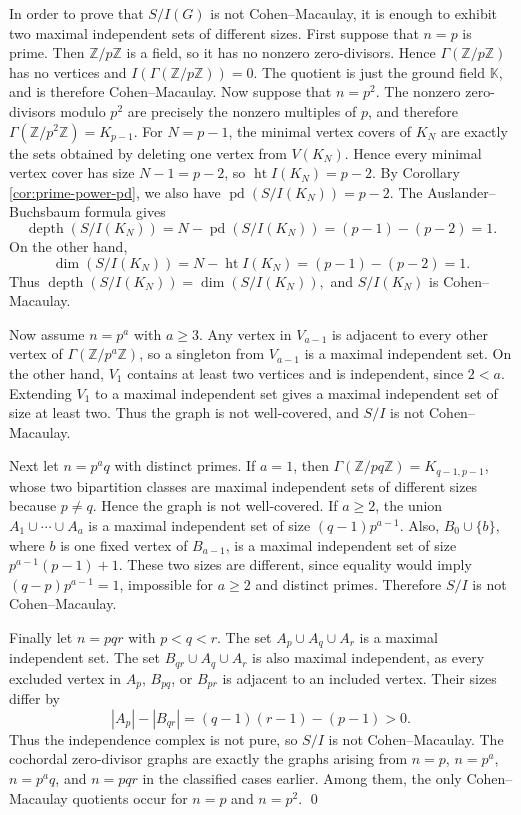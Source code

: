 \documentclass[12pt]{article}
\theoremstyle{definition}
\renewenvironment{proof}{{\bf \noindent Proof.}}{\qed}
\begin{document}
\begin{proof}
	In order to prove that $S/I(G)$ is not Cohen--Macaulay, it
	is enough to exhibit two maximal independent sets of different sizes.
	 First suppose that $n=p$ is prime.  Then $\mathbb{Z}/p\mathbb{Z}$ is a field, so it has no
	nonzero zero-divisors.  Hence $\Gamma(\mathbb{Z}/p\mathbb{Z})$ has no vertices and
	$I(\Gamma(\mathbb{Z}/p\mathbb{Z}))=0$.  The quotient is just the ground field $\mathbb{K}$, and is
	therefore Cohen--Macaulay. Now suppose that $n=p^2$.  The nonzero zero-divisors modulo $p^2$ are precisely
	the nonzero multiples of $p$,   and therefore
	$ \Gamma(\mathbb{Z}/p^2\mathbb{Z})=K_{p-1}. $ For $N=p-1$, the minimal vertex covers of $K_N$ are exactly the sets obtained by deleting
	one vertex from $V(K_N)$.  Hence every minimal vertex cover has size $N-1=p-2$,
	so $
	\operatorname{ht} I(K_N)=p-2. $
	By Corollary \ref{cor:prime-power-pd},   we also have
	$
	\operatorname{pd}(S/I(K_N))=p-2.
	$
	The Auslander--Buchsbaum formula gives
	$$
	\operatorname{depth}(S/I(K_N))
	=
	N-\operatorname{pd}(S/I(K_N))
	=
	(p-1)-(p-2)
	=
	1.
	$$
	On the other hand,
	$$
	\dim(S/I(K_N))
	=
	N-\operatorname{ht} I(K_N)
	=
	(p-1)-(p-2)
	=
	1.
	$$
	Thus $
	\operatorname{depth}(S/I(K_N))=\dim(S/I(K_N)), $
	and $S/I(K_N)$ is Cohen--Macaulay.

\medskip

Now assume $n=p^a$ with $a\geq 3$.  Any vertex in $V_{a-1}$ is adjacent to every other vertex of $\Gamma(\mathbb{Z}/p^a\mathbb{Z})$, so a singleton from $V_{a-1}$ is a maximal independent set.  On the other hand, $V_1$ contains at least two vertices and is independent, since $2<a$.  Extending $V_1$ to a maximal independent set gives a maximal independent set of size at least two.  Thus the graph is not well-covered, and $S/I$ is not Cohen--Macaulay.

\medskip

Next let $n=p^a q$ with distinct primes.  If $a=1$, then $\Gamma(\mathbb{Z}/pq\mathbb{Z})=K_{q-1,p-1}$, whose two bipartition classes are maximal independent sets of different sizes because $p\neq q$.  Hence the graph is not well-covered.  If $a\geq 2$, the union $A_1\cup\cdots\cup A_a$ is a maximal independent set of size $(q-1)p^{a-1}$.  Also, $B_0\cup\{b\}$, where $b$ is one fixed vertex of $B_{a-1}$, is a maximal independent set of size $p^{a-1}(p-1)+1$.  These two sizes are different, since equality would imply $(q-p)p^{a-1}=1$, impossible for $a\geq 2$ and distinct primes.  Therefore $S/I$ is not Cohen--Macaulay.

\medskip

Finally let $n=pqr$ with $p<q<r$.  The set $A_p\cup A_q\cup A_r$ is a maximal independent set.  The set $B_{qr}\cup A_q\cup A_r$ is also maximal independent, as every excluded vertex in $A_p$, $B_{pq}$, or $B_{pr}$ is adjacent to an included vertex.  Their sizes differ by
$$
|A_p|-|B_{qr}|=(q-1)(r-1)-(p-1)>0.
$$
Thus the independence complex is not pure, so $S/I$ is not Cohen--Macaulay.   The cochordal zero-divisor graphs are exactly the graphs arising from $n=p$, $n=p^a$, $n=p^aq$, and $n=pqr$ in the classified cases earlier.  Among
	them, the only Cohen--Macaulay quotients occur for $n=p$ and $n=p^2$.  
\end{proof}
\medskip
\end{document}
